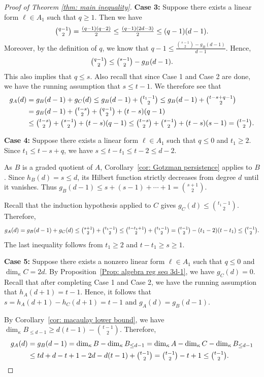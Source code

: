 \documentclass[11pt]{amsart}
\theoremstyle{definition}
\newcommand{\dimk}{\dim_{\kappa}}
\begin{document}
\begin{proof}[Proof of Theorem \ref{thm: main inequality}]
\noindent\textbf{Case 3:} Suppose there exists a linear form $\ell\in A_1$ such that $q\geq 1$.
Then we have
\[
\tbinom{q-1}{2}
=\tfrac{(q-1)(q-2)}{2}
\leq \tfrac{(q-1)(2d-3)}{2}
\leq (q-1)(d-1).
\]
Moreover, by the definition of $q$, we know that $q-1\leq \frac{\binom{s-1}{2}- g_B(d-1) }{d-1}$. Hence, 
\[
\tbinom{q-1}{2}
\leq \tbinom{s-1}{2}-g_B(d-1).
\]
This also implies that $q\leq s$. Also recall that since Case 1 and Case 2 are done, we have the running assumption that $s\leq t-1$.
We therefore see that
\begin{align*}
g_A(d)
&= g_B(d-1) +g_C(d)
\leq g_B(d-1) + \tbinom{t_1-1}{2}
\leq g_B(d-1) + \tbinom{t-s+q-1}{2}\\
&= g_B(d-1) + \tbinom{t-s}{2} +\tbinom{q-1}{2} +(t-s)(q-1)\\
&\leq \tbinom{t-s}{2} +\tbinom{s-1}{2} +(t-s)(q-1)
\leq \tbinom{t-s}{2} +\tbinom{s-1}{2} +(t-s)(s-1)
=\tbinom{t-1}{2}.
\end{align*}



\noindent\textbf{Case 4:} Suppose there exists a linear form $\ell\in A_1$ such that $q\leq 0$ and $t_1\geq2$. Since $t_1\leq t-s+q$, we have $s\leq t-t_1\leq t-2\leq d-2$.

As $B$ is a graded quotient of $A$, Corollary~\ref{cor: Gotzman persistence} applies to $B$. Since $h_B(d)=s\leq d$, its Hilbert function strictly decreases from degree $d$ until it vanishes. Thus $g_B(d-1)\leq s+(s-1)+\cdots+1=\binom{s+1}{2}$.

Recall that the induction hypothesis applied to $C$ gives $g_C(d)\leq \binom{t_1-1}{2}$. Therefore,
\[
g_A(d)
= g_B(d-1)+g_C(d)
\leq \tbinom{s+1}{2}+\tbinom{t_1-1}{2}
\leq \tbinom{t-t_1+1}{2}+\tbinom{t_1-1}{2}
= \tbinom{t-1}{2}-(t_1-2)(t-t_1)
\leq \tbinom{t-1}{2}.
\]
The last inequality follows from $t_1\geq 2$ and $t-t_1\geq s\geq 1$.


\noindent\textbf{Case 5:} Suppose there exists a nonzero linear form $\ell\in A_1$ such that $q\leq 0$ and $\dimk C=2d$. By Proposition~\ref{Prop: algebra reg seq 3d-1}, we have $g_C(d)=0$. 
Recall that after completing Case 1 and Case 2, we have the running assumption that $h_A(d+1)=t-1$. Hence, it follows that $s=h_A(d+1)-h_C(d+1)=t-1$ and $g_A(d)=g_B(d-1)$.

By Corollary~\ref{cor: macaulay lower bound}, we have $\dimk B_{\leq d-1}\geq d(t-1)-\binom{t-1}{2}$. Therefore,
\begin{align*}
g_A(d)
&= g_B(d-1) = \dimk B - \dimk B_{\leq d-1}
= \dimk A-\dimk C-\dimk B_{\leq d-1}\\
&\leq td+d-t+1-2d-d(t-1)+\tbinom{t-1}{2}
= \tbinom{t-1}{2}-t+1
\leq \tbinom{t-1}{2}.
\end{align*}







\end{proof}
\end{document}
